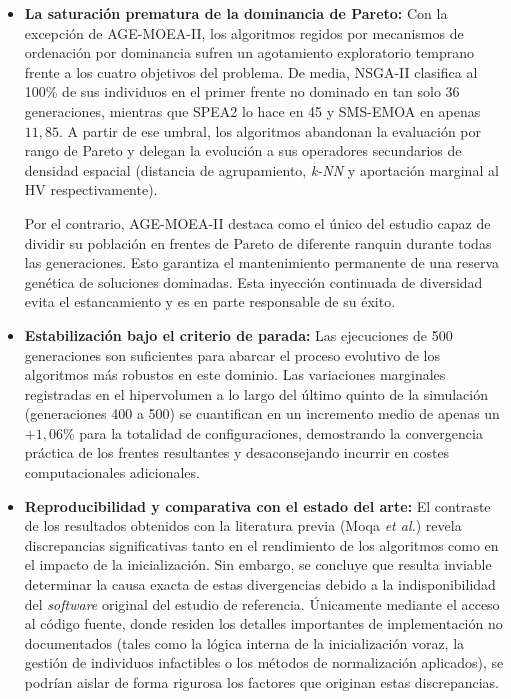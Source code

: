 \begin{itemize}
    \item \textbf{La saturación prematura de la dominancia de Pareto:} Con la excepción de AGE-MOEA-II, los algoritmos regidos por mecanismos de ordenación por dominancia sufren un agotamiento exploratorio temprano frente a los cuatro objetivos del problema. De media, NSGA-II clasifica al 100\% de sus individuos en el primer frente no dominado en tan solo 36 generaciones, mientras que SPEA2 lo hace en 45 y SMS-EMOA en apenas $11{,}85$. A partir de ese umbral, los algoritmos abandonan la evaluación por rango de Pareto y delegan la evolución a sus operadores secundarios de densidad espacial (distancia de agrupamiento, \textit{k-NN} y aportación marginal al HV respectivamente).
    
    Por el contrario, AGE-MOEA-II destaca como el único del estudio capaz de dividir su población en frentes de Pareto de diferente ranquin durante todas las generaciones. Esto garantiza el mantenimiento permanente de una reserva genética de soluciones dominadas. Esta inyección continuada de diversidad evita el estancamiento y es en parte responsable de su éxito.
    \item \textbf{Estabilización bajo el criterio de parada:} Las ejecuciones de 500 generaciones son suficientes para abarcar el proceso evolutivo de los algoritmos más robustos en este dominio. Las variaciones marginales registradas en el hipervolumen a lo largo del último quinto de la simulación (generaciones 400 a 500) se cuantifican en un incremento medio de apenas un $+1{,}06\%$ para la totalidad de configuraciones, demostrando la convergencia práctica de los frentes resultantes y desaconsejando incurrir en costes computacionales adicionales.
    \item \textbf{Reproducibilidad y comparativa con el estado del arte:} El contraste de los resultados obtenidos con la literatura previa (Moqa \textit{et al.}) revela discrepancias significativas tanto en el rendimiento de los algoritmos como en el impacto de la inicialización. Sin embargo, se concluye que resulta inviable determinar la causa exacta de estas divergencias debido a la indisponibilidad del \textit{software} original del estudio de referencia. Únicamente mediante el acceso al código fuente, donde residen los detalles importantes de implementación no documentados (tales como la lógica interna de la inicialización voraz, la gestión de individuos infactibles o los métodos de normalización aplicados), se podrían aislar de forma rigurosa los factores que originan estas discrepancias.
\end{itemize}

